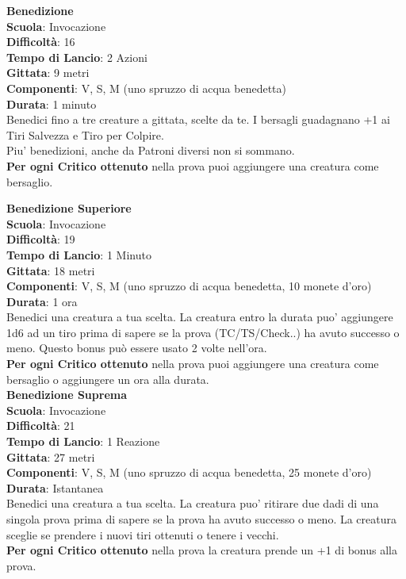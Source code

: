 \begin{multicols}{2}
\medskip\textbf{Benedizione}\\
\textbf{Scuola}: Invocazione\\
\textbf{Difficoltà}: 16\\
\textbf{Tempo di Lancio}: 2 Azioni\\
\textbf{Gittata}: 9 metri\\
\textbf{Componenti}: V, S, M (uno spruzzo di acqua benedetta)\\
\textbf{Durata}: 1 minuto\\
Benedici fino a tre creature a gittata, scelte da te. I bersagli guadagnano +1 ai Tiri Salvezza e Tiro per Colpire.\\
Piu' benedizioni, anche da Patroni diversi non si sommano.\\
\textbf{Per ogni Critico ottenuto} nella prova puoi aggiungere una creatura come bersaglio.

\medskip\textbf{Benedizione Superiore}\\
\textbf{Scuola}: Invocazione\\
\textbf{Difficoltà}: 19\\
\textbf{Tempo di Lancio}: 1 Minuto\\
\textbf{Gittata}: 18 metri\\
\textbf{Componenti}: V, S, M (uno spruzzo di acqua benedetta, 10 monete d'oro)\\
\textbf{Durata}: 1 ora\\
Benedici una creatura a tua scelta. La creatura entro la durata puo' aggiungere 1d6 ad un tiro prima di sapere se la prova (TC/TS/Check..) ha avuto successo o meno. Questo bonus può essere usato 2 volte nell'ora.\\
\textbf{Per ogni Critico ottenuto} nella prova puoi aggiungere una creatura come bersaglio o aggiungere un ora alla durata.\\

\medskip\textbf{Benedizione Suprema}\\
\textbf{Scuola}: Invocazione\\
\textbf{Difficoltà}: 21\\
\textbf{Tempo di Lancio}: 1 Reazione\\
\textbf{Gittata}: 27 metri\\
\textbf{Componenti}: V, S, M (uno spruzzo di acqua benedetta, 25 monete d'oro)\\
\textbf{Durata}: Istantanea\\
Benedici una creatura a tua scelta. La creatura puo' ritirare due dadi di una singola prova prima di sapere se la prova ha avuto successo o meno. La creatura sceglie se prendere i nuovi tiri ottenuti o tenere i vecchi.\\
\textbf{Per ogni Critico ottenuto} nella prova la creatura prende un +1 di bonus alla prova.\\


\end{multicols}
